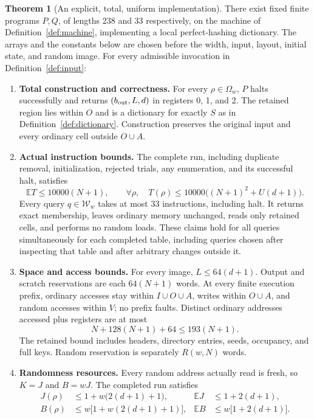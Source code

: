 \documentclass[11pt,a4paper]{article}
\theoremstyle{definition}
\newtheorem{theorem}{Theorem}
\newcommand{\E}{\mathbb E}
\newcommand{\W}{\mathcal W_w}
\begin{document}
\begin{theorem}[An explicit, total, uniform implementation]\label{thm:main}
There exist fixed finite programs $P,Q$, of lengths 238 and 33 respectively,
on the machine of Definition~\ref{def:machine}, implementing a local
perfect-hashing dictionary. The arrays and the constants below are chosen
before the width, input, layout, initial state, and random image.
For every admissible invocation in Definition~\ref{def:input}:
\begin{enumerate}[label=\textup{(\roman*)}]
\item \textbf{Total construction and correctness.}
For every $\rho\in\Omega_w$, $P$ halts successfully and returns
$(b_{\rm out},L,d)$ in registers 0, 1, and 2. The retained region lies
within $O$ and is a dictionary for exactly $S$ as in
Definition~\ref{def:dictionary}. Construction preserves the original input
and every ordinary cell outside $O\cup A$.

\item \textbf{Actual instruction bounds.}
The complete run, including duplicate removal, initialization, rejected
trials, any enumeration, and its successful halt, satisfies
\[
 \E T\le10000(N+1),\qquad
 \forall\rho,\quad T(\rho)\le10000\bigl((N+1)^2+U(d+1)\bigr).
\]
Every query $q\in\W$ takes at most 33 instructions, including halt.
It returns exact membership, leaves ordinary memory unchanged, reads only
retained cells, and performs no random loads. These claims hold for all
queries simultaneously for each completed table, including queries chosen
after inspecting that table and after arbitrary changes outside it.

\item \textbf{Space and access bounds.}
For every image, $L\le64(d+1)$. Output and scratch reservations are each
$64(N+1)$ words. At every finite execution prefix, ordinary accesses stay
within $I\cup O\cup A$, writes within $O\cup A$, and random accesses
within $V$; no prefix faults. Distinct ordinary addresses accessed plus
registers are at most
\[
 N+128(N+1)+64\le193(N+1).
\]
The retained bound includes headers, directory entries, seeds, occupancy,
and full keys. Random reservation is separately $R(w,N)$ words.

\item \textbf{Randomness resources.}
Every random address actually read is fresh, so $K=J$ and $B=wJ$.
The completed run satisfies
\begin{align*}
 J(\rho)&\le1+w\bigl(2(d+1)+1\bigr),
 &\E J&\le1+2(d+1),\\
 B(\rho)&\le w\bigl[1+w(2(d+1)+1)\bigr],
 &\E B&\le w\bigl[1+2(d+1)\bigr].
\end{align*}


\end{enumerate}
\end{theorem}
\end{document}
